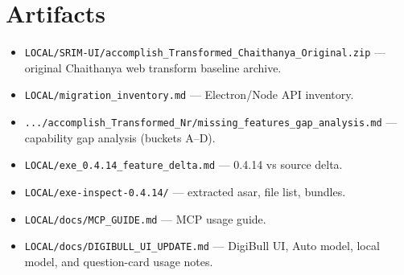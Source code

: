 \documentclass[11pt,a4paper]{article}
\begin{document}
\section{Artifacts}
\begin{itemize}[leftmargin=1.4em,topsep=2pt]
  \item \verb|LOCAL/SRIM-UI/accomplish_Transformed_Chaithanya_Original.zip| ---
        original Chaithanya web transform baseline archive.
  \item \verb|LOCAL/migration_inventory.md| --- Electron/Node API inventory.
  \item \verb|.../accomplish_Transformed_Nr/missing_features_gap_analysis.md| ---
        capability gap analysis (buckets A--D).
  \item \verb|LOCAL/exe_0.4.14_feature_delta.md| --- 0.4.14 vs source delta.
  \item \verb|LOCAL/exe-inspect-0.4.14/| --- extracted asar, file list, bundles.
  \item \verb|LOCAL/docs/MCP_GUIDE.md| --- MCP usage guide.
  \item \verb|LOCAL/docs/DIGIBULL_UI_UPDATE.md| --- DigiBull UI, Auto model,
        local model, and question-card usage notes.
\end{itemize}
\end{document}
